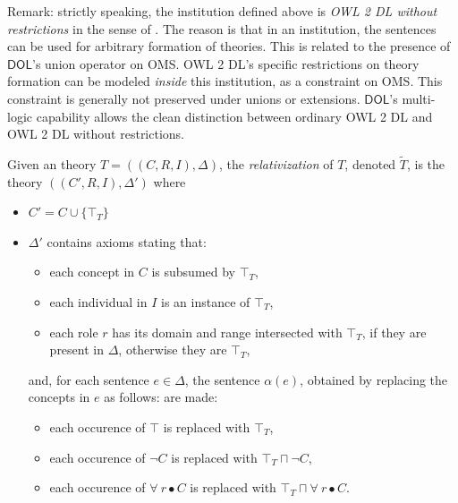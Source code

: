 \documentclass[10pt, a4paper]{isov2}
\newcommand*{\DOL}{\ensuremath{\mathsf{DOL}}\xspace}
\begin{document}
Remark: strictly speaking, the institution defined above is
\emph{{OWL} 2 DL without restrictions} in the sense of
\cite{DBLP:conf/owled/SchneiderRS13}. The reason is that in an
institution, the sentences can be used for arbitrary formation of
theories. This is related to the presence of \DOL's union operator on
OMS.  OWL 2 DL's specific restrictions on theory formation can be
modeled \emph{inside} this institution, as a constraint on OMS.  This
constraint is generally not preserved under unions or
extensions. \DOL's multi-logic capability allows the clean distinction
between ordinary OWL 2 DL and {OWL} 2 DL without restrictions.



\begin{definition}
Given an \OWL theory $T = ((C,R,I), \Delta)$,
the \emph{relativization} of $T$, denoted $\tilde{T}$, is the theory 
$((C',R,I),\Delta')$ where
 \begin{itemize} 
\item $C' = C\cup\{\top_T\}$
\item $\Delta'$ contains axioms stating that:
   \begin{itemize} 
    \item each concept in $C$ is subsumed by $\top_T$,
    \item each individual in $I$ is an instance of $\top_T$,
    \item each role $r$ has its domain and range intersected with $\top_T$, if they
    are present in $\Delta$, otherwise they are $\top_T$,
   \end{itemize} 
  \noindent and, for each sentence $e\in\Delta$, the sentence $\alpha(e)$, obtained by
  replacing the concepts in $e$ as follows:
  are made:
   \begin{itemize} 
   \item each occurence of $\top$ is replaced with $\top_T$,
   \item each occurence of $\neg C$ is replaced with $\top_T \sqcap \neg C$,
   \item each occurence of $\forall~r\bullet C$ is replaced with 
   $\top_T \sqcap \forall~r\bullet C$.
   \end{itemize} 
 \end{itemize} 
\end{definition}
\end{document}
